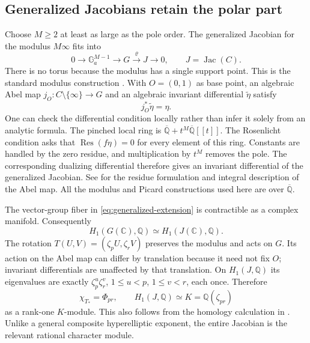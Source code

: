 \documentclass[11pt,a4paper]{article}
\numberwithin{equation}{section}
\theoremstyle{definition}
\theoremstyle{remark}
\newcommand{\Q}{\mathbb Q}
\newcommand{\Qb}{\overline{\mathbb Q}}
\newcommand{\C}{\mathbb C}
\newcommand{\Ga}{\mathbb G_a}
\newcommand{\Jac}{\operatorname{Jac}}
\begin{document}
\subsection{Generalized Jacobians retain the polar part}
Choose $M\ge2$ at least as large as the pole order. The generalized
Jacobian for the modulus $M\infty$ fits into
\begin{equation}\label{eq:generalized-extension}
 0\longrightarrow \Ga^{M-1}\longrightarrow G
 \xrightarrow{\varrho}J\longrightarrow0,
 \qquad J=\Jac(C).
\end{equation}
There is no torus because the modulus has a single support point.
This is the standard modulus construction \cite{Zannier}. With
$O=(0,1)$ as base point, an algebraic Abel map
$j_O:C\setminus\{\infty\}\to G$ and an algebraic invariant differential
$\widetilde\eta$ satisfy
\begin{equation}
 j_O^*\widetilde\eta=\eta.
\end{equation}
One can check the differential condition locally rather than infer it
solely from an analytic formula. The pinched local ring is
$\Qb+t^M\Qb[[t]]$. The Rosenlicht condition asks that
$\operatorname{Res}(f\eta)=0$ for every element of this ring. Constants
are handled by the zero residue, and multiplication by $t^M$ removes the
pole. The corresponding dualizing differential therefore gives an
invariant differential of the generalized Jacobian. See \cite{ACL} for
the residue formulation and integral description of the Abel map.
All the modulus and Picard constructions used here are over $\Qb$.

The vector-group fiber in \eqref{eq:generalized-extension} is contractible
as a complex manifold. Consequently
\begin{equation}
 H_1(G(\C),\Q)\simeq H_1(J(\C),\Q).
\end{equation}
The rotation $T(U,V)=(\zeta_pU,\zeta_rV)$ preserves the modulus and acts on
$G$. Its action on the Abel map can differ by translation because it need
not fix $O$; invariant differentials are unaffected by that translation.
On $H_1(J,\Q)$ its eigenvalues are exactly
$\zeta_p^u\zeta_r^v$, $1\le u<p$, $1\le v<r$, each once. Therefore
\begin{equation}\label{eq:fermat-homology}
 \chi_{T_*}=\Phi_{pr},\qquad H_1(J,\Q)\simeq K=\Q(\zeta_{pr})
\end{equation}
as a rank-one $K$-module. This also follows from the homology calculation
in \cite[Proposition 2.4.4 and Corollary 2.4.5]{Arul}. Unlike a general
composite hyperelliptic exponent, the entire Jacobian is the relevant
rational character module.
\end{document}
